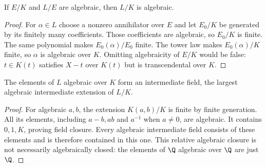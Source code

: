 \begin{theorem}
If $E/K$ and $L/E$ are algebraic, then $L/K$ is algebraic.
\end{theorem}
\begin{proof}
For $\alpha\in L$ choose a nonzero annihilator over $E$ and let $E_0/K$ be generated by its finitely many coefficients. Those coefficients are algebraic, so $E_0/K$ is finite. The same polynomial makes $E_0(\alpha)/E_0$ finite. The tower law makes $E_0(\alpha)/K$ finite, so $\alpha$ is algebraic over $K$. Omitting algebraicity of $E/K$ would be false: $t\in K(t)$ satisfies $X-t$ over $K(t)$ but is transcendental over $K$.
\end{proof}

\begin{theorem}
The elements of $L$ algebraic over $K$ form an intermediate field, the largest algebraic intermediate extension of $L/K$.
\end{theorem}
\begin{proof}
For algebraic $a,b$, the extension $K(a,b)/K$ is finite by finite generation. All its elements, including $a-b,ab$ and $a^{-1}$ when $a\ne0$, are algebraic. It contains $0,1,K$, proving field closure. Every algebraic intermediate field consists of these elements and is therefore contained in this one. This relative algebraic closure is not necessarily algebraically closed: the elements of $\Q$ algebraic over $\Q$ are just $\Q$.
\end{proof}


